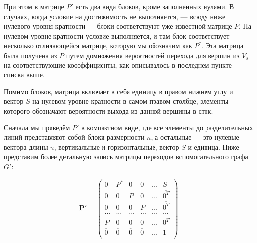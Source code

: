 При этом в матрице $P'$ есть два вида блоков, кроме заполненных нулями. В случаях, когда условие на достижимость не выполняется, --- всюду ниже нулевого уровня кратности --- блоки соответствуют уже известной матрице $P$. На нулевом уровне кратности условие выполняется, и там блок соответствует несколько отличающейся матрице, которую мы обозначим как $P^*$. Эта матрица была получена из $P$ путем домножения вероятностей перехода для вершин из $V_s$ на соответствующие кооэффициенты, как описывалось в последнем пункте списка выше.

Помимо блоков, матрица включает в себя единицу в правом нижнем углу и вектор $S$ на нулевом уровне кратности в самом правом столбце, элементы которого обозначают вероятности выхода из данной вершины в сток.	

Сначала мы приведём $P'$ в компактном виде, где все элементы до разделительных линий представляют собой блоки размерности $n$, а остальные --- это нулевые вектора длины $n$, вертикальные и горизонтальные, вектор $S$ и единица. Ниже представим более детальную запись матрицы переходов вспомогательного графа $G'$:

\begin{displaymath}
\mathbf{P'} =
\left( \begin{array}{ccccc|c}
0 & P^* & 0 & 0 & ... & S \\
0 & 0 & P & 0 & ... & \overline {0^T} \\
0 & 0 & 0 & P & ... & \overline {0^T} \\
... & ... & ... & ... & ... & ... \\
P & 0 & 0 & 0 & ... & \overline {0^T} \\
\hline
\overline 0 &  \overline 0 &  \overline 0 &  \overline 0 & ... & 1 \\
\end{array} \right)
\end{displaymath}

